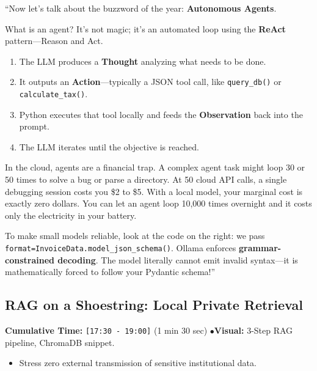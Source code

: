 \documentclass[11pt,a4paper]{article}
\begin{document}
\begin{speechbox}
``Now let's talk about the buzzword of the year: \textbf{Autonomous Agents}.

What is an agent? It's not magic; it's an automated loop using the \textbf{ReAct} pattern---Reason and Act.
\begin{enumerate}
    \item The LLM produces a \textbf{Thought} analyzing what needs to be done.
    \item It outputs an \textbf{Action}---typically a JSON tool call, like \texttt{query\_db()} or \texttt{calculate\_tax()}.
    \item Python executes that tool locally and feeds the \textbf{Observation} back into the prompt.
    \item The LLM iterates until the objective is reached.
\end{enumerate}

In the cloud, agents are a financial trap. A complex agent task might loop 30 or 50 times to solve a bug or parse a directory. At 50 cloud API calls, a single debugging session costs you \$2 to \$5. With a local model, your marginal cost is exactly zero dollars. You can let an agent loop 10,000 times overnight and it costs only the electricity in your battery.

To make small models reliable, look at the code on the right: we pass \texttt{format=InvoiceData.model\_json\_schema()}. Ollama enforces \textbf{grammar-constrained decoding}. The model literally cannot emit invalid syntax---it is mathematically forced to follow your Pydantic schema!''
\end{speechbox}

\subsection{RAG on a Shoestring: Local Private Retrieval}
\begin{directionbox}
    \textbf{Cumulative Time:} \texttt{[17:30 - 19:00]} (1 min 30 sec) \quad$\bullet$\quad \textbf{Visual:} 3-Step RAG pipeline, ChromaDB snippet.
    \begin{itemize}
        \item Stress zero external transmission of sensitive institutional data.
    \end{itemize}
\end{directionbox}
\end{document}
